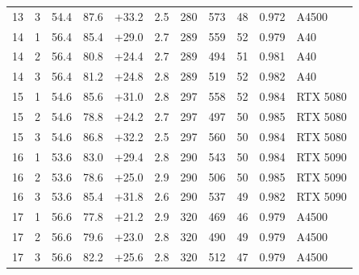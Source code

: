 \begin{table}[H]
\begin{tabular}{@{}rrrrrrrrrrl@{}}
13 & 3 & 54.4 & 87.6 & +33.2 & 2.5 & 280 & 573 & 48 & 0.972 & A4500 \\
14 & 1 & 56.4 & 85.4 & +29.0 & 2.7 & 289 & 559 & 52 & 0.979 & A40 \\
14 & 2 & 56.4 & 80.8 & +24.4 & 2.7 & 289 & 494 & 51 & 0.981 & A40 \\
14 & 3 & 56.4 & 81.2 & +24.8 & 2.8 & 289 & 519 & 52 & 0.982 & A40 \\
15 & 1 & 54.6 & 85.6 & +31.0 & 2.8 & 297 & 558 & 52 & 0.984 & RTX 5080 \\
15 & 2 & 54.6 & 78.8 & +24.2 & 2.7 & 297 & 497 & 50 & 0.985 & RTX 5080 \\
15 & 3 & 54.6 & 86.8 & +32.2 & 2.5 & 297 & 560 & 50 & 0.984 & RTX 5080 \\
16 & 1 & 53.6 & 83.0 & +29.4 & 2.8 & 290 & 543 & 50 & 0.984 & RTX 5090 \\
16 & 2 & 53.6 & 78.6 & +25.0 & 2.9 & 290 & 506 & 50 & 0.985 & RTX 5090 \\
16 & 3 & 53.6 & 85.4 & +31.8 & 2.6 & 290 & 537 & 49 & 0.982 & RTX 5090 \\
17 & 1 & 56.6 & 77.8 & +21.2 & 2.9 & 320 & 469 & 46 & 0.979 & A4500 \\
17 & 2 & 56.6 & 79.6 & +23.0 & 2.8 & 320 & 490 & 49 & 0.979 & A4500 \\
17 & 3 & 56.6 & 82.2 & +25.6 & 2.8 & 320 & 512 & 47 & 0.979 & A4500 \\
\bottomrule
\end{tabular}
\end{table}
